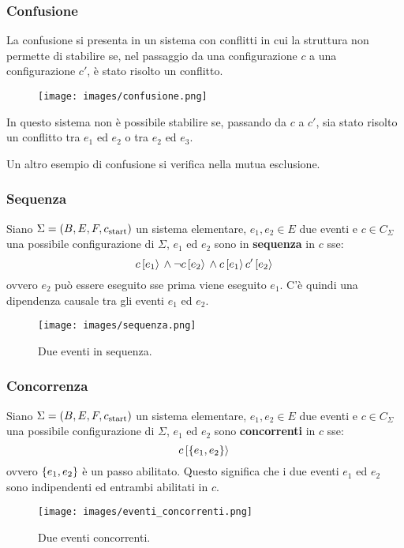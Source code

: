 \subsubsection{Confusione}
La confusione si presenta in un sistema con conflitti in cui la struttura non permette di stabilire se, nel passaggio da una configurazione $c$ a una configurazione $c'$, è stato risolto un conflitto.

\begin{figure}
    \centering
    \texttt{[image: images/confusione.png]}
    \label{fig:confusione}
\end{figure}
In questo sistema non è possibile stabilire se, passando da $c$ a $c'$, sia stato risolto un conflitto tra $e_1$ ed $e_2$ o tra $e_2$ ed $e_3$.

Un altro esempio di confusione si verifica nella mutua esclusione.

\subsubsection{Sequenza}
Siano $\Sigma = (B, E, F, c_{\textnormal{start}})$ un sistema elementare, $e_1, e_2 \in E$ due eventi e $c \in C_{\Sigma}$ una possibile configurazione di $\Sigma$, $e_1$ ed $e_2$ sono in \textbf{sequenza} in $c$ sse:
\[
    c\,[e_1\rangle\, \land \lnot c\,[e_2\rangle\, \land c\,[e_1\rangle\,c'\,[e_2\rangle\,\]
ovvero $e_2$ può essere eseguito sse prima viene eseguito $e_1$.
C'è quindi una dipendenza causale tra gli eventi $e_1$ ed $e_2$.

\begin{figure}
    \centering
    \texttt{[image: images/sequenza.png]}
    \caption{Due eventi in sequenza.}
    \label{fig:eventi_sequenza}
\end{figure}

\subsubsection{Concorrenza}
Siano $\Sigma = (B, E, F, c_{\textnormal{start}})$ un sistema elementare, $e_1, e_2 \in E$ due eventi e $c \in C_{\Sigma}$ una possibile configurazione di $\Sigma$, $e_1$ ed $e_2$ sono \textbf{concorrenti} in $c$ sse:
\[
    c\,[\left\{e_1, e_2\right\}\rangle\,
\]
ovvero $\left\{e_1, e_2\right\}$ è un passo abilitato. Questo significa che i due eventi $e_1$ ed $e_2$ sono indipendenti ed entrambi abilitati in $c$.

\begin{figure}
    \centering
    \texttt{[image: images/eventi\_concorrenti.png]}
    \caption{Due eventi concorrenti.}
    \label{fig:eventi_concorrenti}
\end{figure}


